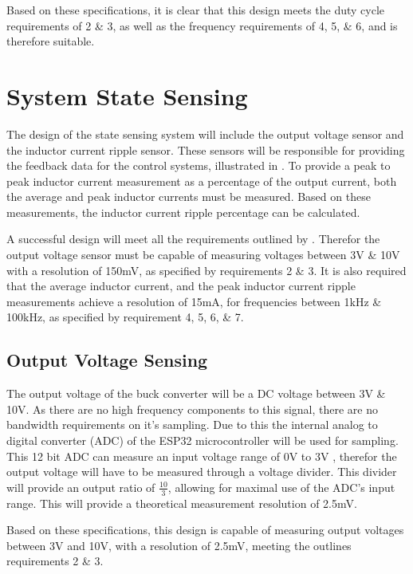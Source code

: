 Based on these specifications, it is clear that this design meets the duty cycle requirements of 2 \& 3, as well as the frequency requirements of 4, 5, \& 6, and is therefore suitable.
 

%
%

\section{System State Sensing}\label{S:sensing_design}

The design of the state sensing system will include the output voltage sensor and the inductor current ripple sensor. These sensors will be responsible for providing the feedback data for the control systems, illustrated in . To provide a peak to peak inductor current measurement as a percentage of the output current, both the average and peak inductor currents must be measured. Based on these measurements, the inductor current ripple percentage can be calculated.

A successful design will meet all the requirements outlined by . Therefor the output voltage sensor must be capable of measuring voltages between 3V \& 10V with a resolution of 150mV, as specified by requirements 2 \& 3. It is also required that the average inductor current, and the peak inductor current ripple measurements achieve a resolution of 15mA, for frequencies between 1kHz \& 100kHz, as specified by requirement 4, 5, 6, \& 7.


\subsection{Output Voltage Sensing}

The output voltage of the buck converter will be a DC voltage between 3V \& 10V. As there are no high frequency components to this signal, there are no bandwidth requirements on it's sampling. Due to this the internal analog to digital converter (ADC) of the ESP32 microcontroller will be used for sampling. This 12 bit ADC can measure an input voltage range of 0V to 3V \cite{ESP32Manual}, therefor the output voltage will have to be measured through a voltage divider. This divider will provide an output ratio of $\frac{10}{3}$, allowing for maximal use of the ADC's input range. This will provide a theoretical measurement resolution of 2.5mV. 

Based on these specifications, this design is capable of measuring output voltages between 3V and 10V, with a resolution of 2.5mV, meeting the outlines requirements 2 \& 3.


